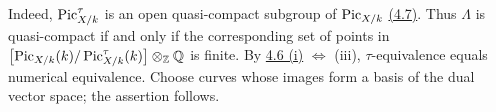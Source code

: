 Indeed, \(\operatorname{Pic}^\tau_{X/k}\) is an open quasi-compact subgroup of
\(\operatorname{Pic}_{X/k}\) \hyperlink{sga6.e13.thm.4-7}{(4.7)}. Thus \(\Lambda\) is quasi-compact if and only if
the corresponding set of points in
\(\bigl[\operatorname{Pic}_{X/k}(k)/\operatorname{Pic}^\tau_{X/k}(k)\bigr]
\otimes_{\mathbb Z}\mathbb Q\) is finite. By \hyperlink{sga6.e13.thm.4-6}{4.6 (i)}
\(\Longleftrightarrow\) (iii),
\(\tau\)-equivalence equals numerical equivalence. Choose curves whose
images form a basis of the dual vector space; the assertion follows.

